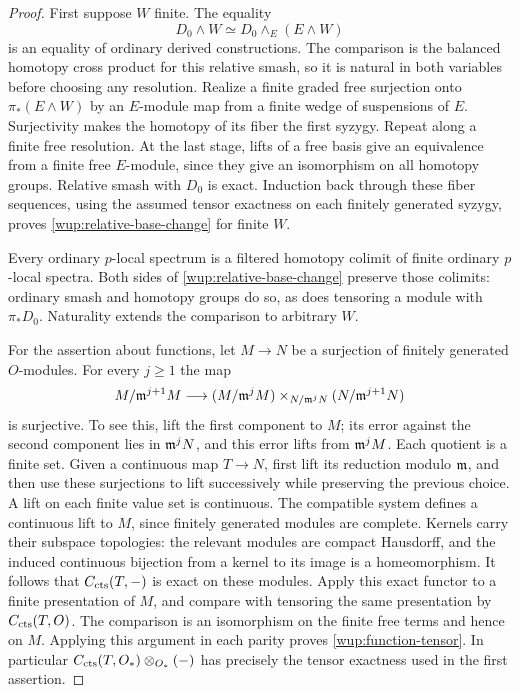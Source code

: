 \begin{proof}
First suppose \(W\) finite. The equality
\[
 D_0\wedge W\simeq D_0\wedge_E(E\wedge W)
\]
is an equality of ordinary derived constructions. The comparison is
the balanced homotopy cross product for this relative smash, so it is
natural in both variables before choosing any resolution.
Realize a finite graded free surjection onto \(\pi_*(E\wedge W)\) by an \(E\)-module
map from a finite wedge of suspensions of \(E\). Surjectivity makes the
homotopy of its fiber the first syzygy. Repeat along a finite free
resolution. At the last stage, lifts of a free basis give an
equivalence from a finite free \(E\)-module, since they give an
isomorphism on all homotopy groups. Relative smash with \(D_0\) is
exact. Induction back through these fiber sequences, using the
assumed tensor exactness on each finitely generated syzygy, proves
\eqref{wup:relative-base-change} for finite \(W\).

Every ordinary \(p\)-local spectrum is a filtered homotopy colimit of
finite ordinary \(p\)-local spectra. Both sides of
\eqref{wup:relative-base-change} preserve those colimits: ordinary
smash and homotopy groups do so, as does tensoring a module with
\(\pi_*D_0\). Naturality extends the comparison to arbitrary \(W\).

For the assertion about functions, let \(M\to N\) be a surjection of
finitely generated \(O\)-modules. For every \(j\geq1\) the map
\[
 M/\mathfrak m^{j+1}M\longrightarrow
 (M/\mathfrak m^jM)\mathbin{\times}_{N/\mathfrak m^jN}(N/\mathfrak m^{j+1}N)
\]
is surjective. To see this, lift the first component to \(M\); its
error against the second component lies in \(\mathfrak m^jN\), and this error
lifts from \(\mathfrak m^jM\). Each quotient is a finite set. Given a continuous
map \(T\to N\), first lift its reduction modulo \(\mathfrak m\), and then use
these surjections to lift successively while preserving the previous
choice. A lift on each finite value set is continuous. The compatible
system defines a continuous lift to \(M\), since finitely generated
modules are complete. Kernels carry their subspace topologies:
the relevant modules are compact Hausdorff, and the induced
continuous bijection from a kernel to its image is a homeomorphism.
It follows that \(C_{\operatorname{cts}}(T,-)\) is exact on these modules. Apply this
exact functor to a finite presentation of \(M\), and compare with
tensoring the same presentation by \(C_{\operatorname{cts}}(T,O)\). The comparison
is an isomorphism on the finite free terms and hence on \(M\).
Applying this argument in each parity proves
\eqref{wup:function-tensor}. In particular
\(C_{\operatorname{cts}}(T,O_*)\otimes_{O_*}(-)\) has precisely the tensor exactness
used in the first assertion.
\end{proof}

